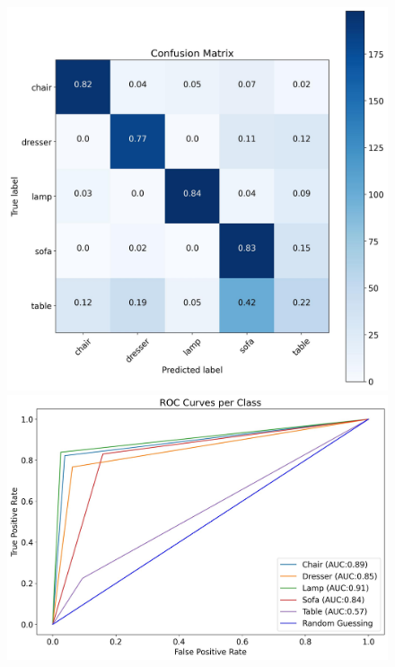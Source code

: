 \documentclass[11pt,a4paper]{article}
\begin{document}
\begin{figure}[H]
{{    \includegraphics[scale=0.13]{imgs/experiments/images/13/Experiment-13-TESTING-confusion-matrix.jpg}
    \includegraphics[scale=0.13]{imgs/experiments/images/13/Experiment-13-TESTING-ROC.jpg}
    }}
    \qquad
\end{figure}
\end{document}
